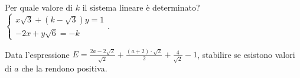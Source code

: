 

\begin{esercizio}%
Per quale valore di \(k\) il sistema lineare è determinato?
\(\left\{\begin{array}{l}{x\sqrt 3+(k-\sqrt 3)y=1}\\
 {-2x+y\sqrt 6=-k} \end{array}\right..\)
\end{esercizio}


\begin{esercizio}%
Data l'espressione 
\(E=\frac{2a-2\sqrt 2}{\sqrt 2}+\frac{(a+2)\cdot \sqrt 2} 2+\frac 4{\sqrt 2}-1\), 
stabilire se esistono valori di \(a\) che la rendono positiva.
\end{esercizio}


